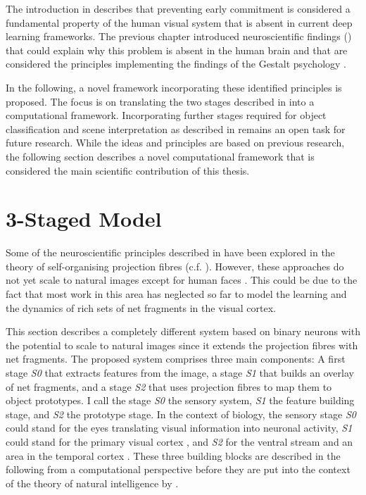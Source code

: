 The introduction in  describes that preventing early commitment is considered a fundamental property of the human visual system that is absent in current deep learning frameworks.
The previous chapter introduced neuroscientific findings () that could explain why this problem is absent in the human brain and that are considered the principles implementing the findings of the Gestalt psychology \cite{ellis_source_1938, kohler_gestalt_1992, wagemans_century_2012, hamlyn_psychology_2017}.

In the following, a novel framework incorporating these identified principles is proposed.
The focus is on translating the two stages described in  into a computational framework.
Incorporating further stages required for object classification and scene interpretation as described in  remains an open task for future research.
While the ideas and principles are based on previous research, the following section describes a novel computational framework that is considered the main scientific contribution of this thesis.

\section{3-Staged Model}
Some of the neuroscientific principles described in  have been explored in the theory of self-organising projection fibres (c.f. ). However, these approaches do not yet scale to natural images except for human faces \cite{wolfrum_recurrent_2008}. This could be due to the fact that most work in this area has neglected so far to model the learning and the dynamics of rich sets of net fragments in the visual cortex.

This section describes a completely different system based on binary neurons with the potential to scale to natural images since it extends the projection fibres with net fragments.
The proposed system comprises three main components: A first stage \emph{S0} that extracts features from the image, a stage \emph{S1} that builds an overlay of net fragments, and a stage \emph{S2} that uses projection fibres to map them to object prototypes.
I call the stage \emph{S0} the sensory system, \emph{S1} the feature building stage, and \emph{S2} the prototype stage.
In the context of biology, the sensory stage \emph{S0} could stand for the eyes translating visual information into neuronal activity, \emph{S1} could stand for the primary visual cortex , and \emph{S2} for the ventral stream and an area in the temporal cortex .
These three building blocks are described in the following from a computational perspective before they are put into the context of the theory of natural intelligence by .

